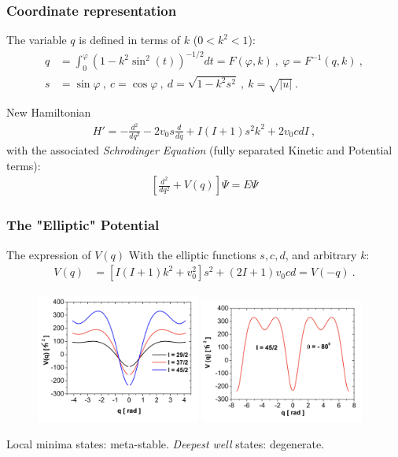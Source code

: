 \documentclass{beamer}
\begin{document}
\begin{frame}
  \frametitle{Coordinate representation}
  The variable $q$ is defined in terms of $k$ ($0<k^2<1$):
\begin{align}
  q&=\int_0^\varphi\left(1-k^2\sin^2(t)\right)^{-1/2}dt=F(\varphi,k)\ ,\ \varphi=F^{-1}(q,k)\ ,\\
  s&=\sin\varphi\ ,\ c=\cos\varphi\ ,\ d=\sqrt{1-k^2s^2}\ ,\ k=\sqrt{|u|}\ .
\end{align}
\begin{exampleblock}{New Hamiltonian}
  \begin{align}
      H'=-\frac{d^2}{dq^2}-2v_0s\frac{d}{dq}+I(I+1)s^2k^2+2v_0cdI\ ,
  \end{align}
  with the associated \emph{Schrodinger Equation} (fully separated Kinetic and Potential terms):
  \begin{align}
    \left[\frac{d^2}{dq^2}+V(q)\right]\Psi=E\Psi
  \end{align}
\end{exampleblock}
\end{frame}

\begin{frame}
  \frametitle{The "Elliptic" Potential}
\begin{block}{The expression of $V(q)$}
  With the elliptic functions $s,c,d$, and arbitrary $k$:
  \begin{align}
    V(q)&=\left[I(I+1)k^2+v_0^2\right]s^2+(2I+1)v_0cd=V(-q)\ .
  \end{align}
\end{block}
\begin{figure}
  \includegraphics[width=0.48\textwidth]{figures/potential-1.png}
  \includegraphics[width=0.48\textwidth]{figures/potential-2.png}
\end{figure}
Local minima states: meta-stable. \emph{Deepest well} states: degenerate.

\end{frame}
\end{document}
